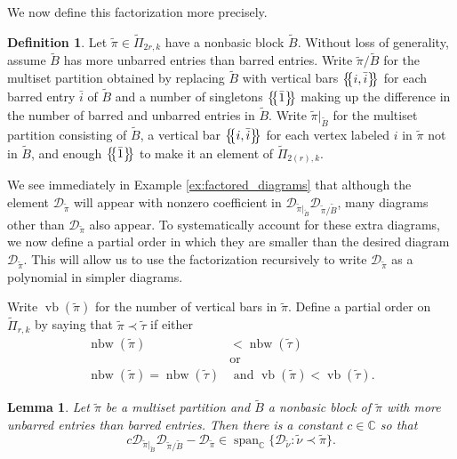 \documentclass[10pt]{amsart}
\theoremstyle{definition}
\newtheorem{defi}[defi]{Definition}
\theoremstyle{definition}
\theoremstyle{plain}
\newtheorem{lemma}[lemma]{Lemma}
\theoremstyle{remark}
\theoremstyle{plain}
\theoremstyle{plain}
\newcommand{\C}{\mathbb{C}}
\newcommand{\DD}{\mathcal{D}}
\newcommand{\ttau}{{\tilde{\tau}}}
\newcommand{\tpi}{{\tilde{\pi}}}
\newcommand{\tnu}{{\tilde{\nu}}}
\newcommand{\tB}{{\tilde{B}}}
\newcommand{\multi}[1]{\left\{\mskip-5mu\left\{#1\right\}\mskip-5mu\right\}}
\newcommand{\ov}[1]{\bar{#1}}
\DeclareMathOperator{\nbw}{nbw}
\DeclareMathOperator{\vb}{vb}
\DeclareMathOperator{\Span}{span}
\begin{document}
We now define this factorization more precisely.

\begin{defi}
    Let $\tpi\in\tilde{\Pi}_{2r,k}$ have a nonbasic block $\tB$. Without loss of generality, assume $\tB$ has more unbarred entries than barred entries. Write $\tpi/\tB$ for the multiset partition obtained by replacing $\tB$ with vertical bars $\multi{i,\ov i}$ for each barred entry $\ov i$ of $\tB$ and a number of singletons $\multi{\ov 1}$ making up the difference in the number of barred and unbarred entries in $\tB$. Write $\tpi|_{\tB}$ for the multiset partition consisting of $\tB$, a vertical bar $\multi{i,\ov i}$ for each vertex labeled $i$ in $\tpi$ not in $\tB$, and enough $\multi{\ov1}$ to make it an element of $\tilde\Pi_{2(r),k}$.
\end{defi}

 We see immediately in Example \ref{ex:factored_diagrams} that although the element $\DD_\tpi$ will appear with nonzero coefficient in $\DD_{\tpi|_{\tB}}\DD_{\tpi/\tB}$, many diagrams other than $\DD_\tpi$ also appear. To systematically account for these extra diagrams, we now define a partial order in which they are smaller than the desired diagram $\DD_\tpi$. This will allow us to use the factorization recursively to write $\DD_\tpi$ as a polynomial in simpler diagrams.

 Write $\vb(\tpi)$ for the number of vertical bars in $\tpi$. Define a partial order on $\tilde{\Pi}_{r,k}$ by saying that $\tpi\prec\ttau$ if either \begin{align*}
    \nbw(\tpi)&<\nbw(\ttau)\\
    &\text{or}\\
    \nbw(\tpi)=\nbw(\ttau)&\text{ and }\vb(\tpi)<\vb(\ttau).
\end{align*}

\begin{lemma}\label{lem:factorize}
    Let $\tpi$ be a multiset partition and $\tB$ a nonbasic block of $\tpi$ with more unbarred entries than barred entries. Then there is a constant $c\in\C$ so that \[c\DD_{\tpi|_{\tB}}\DD_{\tpi/\tB}-\DD_\tpi\in\Span_\C\{\DD_\tnu:\tnu\prec\tpi\}.\]
\end{lemma}
\end{document}
